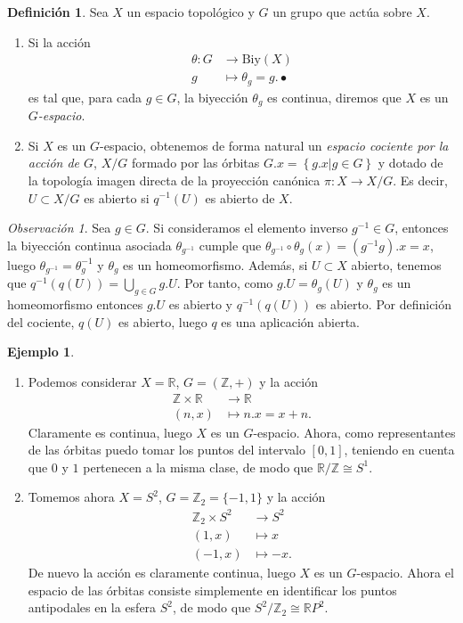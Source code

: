 \documentclass[12pt,a4paper]{book}
\theoremstyle{definition} \newtheorem{defn}[thm]{Definición}
\theoremstyle{definition} \newtheorem{ejemplo}[thm]{Ejemplo}
\theoremstyle{definition} \newtheorem{ejercicio}[thm]{Ejercicio}
\theoremstyle{remark} \newtheorem*{obs}{Observación}
\def\ZZ{\mathbb{Z}}
\def\RR{\mathbb{R}}
\begin{document}
\begin{defn}
  Sea $X$ un espacio topológico y $G$ un grupo que actúa sobre $X$.
  \begin{enumerate}
    \item Si la acción 
      \begin{align*}
	\theta :G&\longrightarrow \mathrm{Biy}(X)\\ 
	  g &\longmapsto \theta_g=g.\bullet 
	\end{align*}
  es tal que, para cada $g\in G$, la biyección $\theta_g$ es continua, diremos que $X$ es un \emph{$G$-espacio}.
\item Si $X$ es un $G$-espacio, obtenemos de forma natural un \emph{espacio cociente por la acción de $G$}, $X/G$ formado por las órbitas $G.x=\left\{ g.x|g\in G \right\}$ y dotado de la topología imagen directa de la proyección canónica $\pi:X\rightarrow X/G$. Es decir, $U\subset X/G$ es abierto si $q^{-1}(U)$ es abierto de $X$.
  \end{enumerate}
\end{defn}
\begin{obs}
  Sea $g\in G$. Si consideramos el elemento inverso $g^{-1}\in G$, entonces la biyección continua asociada $\theta_{g^{-1}}$ cumple que $\theta_{g^{-1}}\circ\theta_{g}(x)=(g^{-1}g).x=x$, luego $\theta_{g^{-1}}=\theta_g^{-1}$ y $\theta_g$ es un homeomorfismo. Además, si $U\subset X$ abierto, tenemos que $q^{-1}(q(U))=\bigcup_{g\in G}g.U$. Por tanto, como $g.U=\theta_g(U)$ y $\theta_g$ es un homeomorfismo entonces $g.U$ es abierto y $q^{-1}(q(U))$ es abierto. Por definición del cociente, $q(U)$ es abierto, luego $q$ es una aplicación abierta.
\end{obs}
\begin{ejemplo}\leavevmode\label{circulo}
  \begin{enumerate}
\item Podemos considerar $X=\RR$, $G=(\ZZ,+)$ y la acción 
  \begin{align*}
     \ZZ\times \RR &\longrightarrow \RR\\ 
      (n,x) &\longmapsto n.x=x+n. 
    \end{align*}
    Claramente es continua, luego $X$ es un $G$-espacio. Ahora, como representantes de las órbitas puedo tomar los puntos del intervalo $[0,1]$, teniendo en cuenta que $0$ y $1$ pertenecen a la misma clase, de modo que $\RR/\ZZ\cong S^1$. 

  \item Tomemos ahora $X=S^2$, $G=\ZZ_2=\{-1,1\}$ y la acción
    \begin{align*}
       \ZZ_2\times S^2&\longrightarrow S^2\\ 
        (1,x) &\longmapsto x \\
        (-1,x) &\longmapsto -x.
      \end{align*}
      De nuevo la acción es claramente continua, luego $X$ es un $G$-espacio. Ahora el espacio de las órbitas consiste simplemente en identificar los puntos antipodales en la esfera $S^2$, de modo que $S^2/\ZZ_2\cong \RR P^2$.
  \end{enumerate} 
\end{ejemplo}
\end{document}
